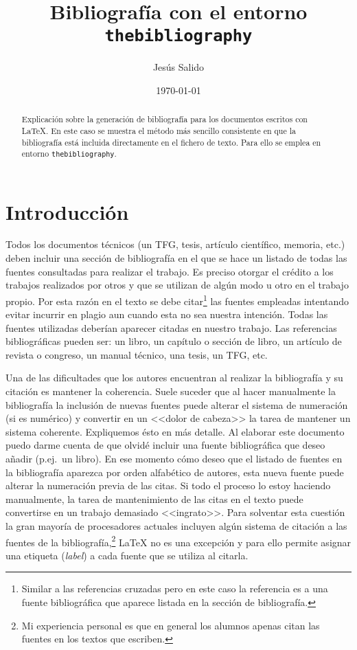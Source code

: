 \documentclass[11pt,a4paper]{article}
\author{Jesús Salido}
\title{Bibliografía con el entorno \texttt{thebibliography}}
\date{\today}
\begin{document}
\maketitle


\begin{abstract}
	Explicación sobre la generación de bibliografía para los documentos escritos con \LaTeX{}. En este caso se muestra el método más sencillo consistente en que la bibliografía está incluida directamente en el fichero de texto. Para ello se emplea en entorno \texttt{thebibliography}.
\end{abstract}

\tableofcontents

\section{Introducción}
Todos los documentos técnicos (un TFG, tesis, artículo científico, memoria, etc.) deben incluir una sección de bibliografía en el que se hace un listado de todas las fuentes consultadas para realizar el trabajo. Es preciso otorgar el crédito a los trabajos realizados por otros y que se utilizan de algún modo u otro en el trabajo propio. Por esta razón en el texto se debe citar\footnote{Similar a las referencias cruzadas pero en este caso la referencia es a una fuente bibliográfica que aparece listada en la sección de bibliografía.} las fuentes empleadas intentando evitar incurrir en plagio \cite{usbplagio2010} aun cuando esta no sea nuestra intención. Todas las fuentes utilizadas deberían aparecer citadas en nuestro trabajo. Las referencias bibliográficas pueden ser: un libro, un capítulo o sección de libro, un artículo de revista o congreso, un manual técnico, una tesis, un TFG, etc.

Una de las dificultades que los autores encuentran al realizar la bibliografía y su citación es mantener la coherencia. Suele suceder que al hacer manualmente la bibliografía la inclusión de nuevas fuentes puede alterar el sistema de numeración (si es numérico) y convertir en un <<dolor de cabeza>> la tarea de mantener un sistema coherente. Expliquemos ésto en más detalle. Al elaborar este documento puedo darme cuenta de que olvidé incluir una fuente bibliográfica que deseo añadir (p.ej.\ un libro). En ese momento cómo deseo que el listado de fuentes en la bibliografía aparezca por orden alfabético de autores, esta nueva fuente puede alterar la numeración previa de las citas. Si todo el proceso lo estoy haciendo manualmente, la tarea de mantenimiento de las citas en el texto puede convertirse en un trabajo demasiado <<ingrato>>. Para solventar esta cuestión la gran mayoría de procesadores actuales incluyen algún sistema de citación a las fuentes de la bibliografía,\footnote{Mi experiencia personal es que en general los alumnos apenas citan las fuentes en los textos que escriben.} \LaTeX{} no es una excepción y para ello permite asignar una etiqueta (\emph{label}) a cada fuente que se utiliza al citarla. 
\end{document}
